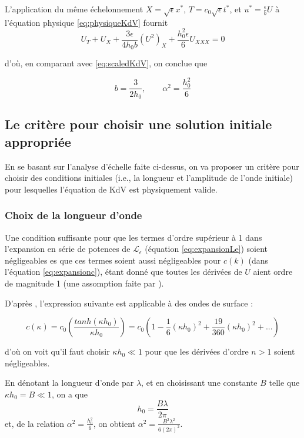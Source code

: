 \indent L'application du même échelonnement $ X=\sqrt{\epsilon}x^*$, $T =c_0 \sqrt{\epsilon} t^*$, et $u^* = \frac{\epsilon}{ b} U$ à l'équation physique \eqref{eq:physiqueKdV} fournit $$U_T + U_X + \frac{3\epsilon}{4h_0b} (U^2)_X + \frac{h_0^2\epsilon}{6}U_{XXX} = 0$$ 

\noindent d'où, en comparant avec  \eqref{eq:scaledKdV}, on conclue que 

\begin{equation}
\label{eq:analysisb}
b = \frac{3}{2h_0}, \qquad \alpha^2 = \frac{h_0^2}{6}
\end{equation} 


\subsection{Le critère pour choisir une solution initiale appropriée}

\indent En se basant sur l'analyse d'échelle faite ci-dessus, on va proposer un critère pour choisir des conditions initiales (i.e., la longueur et l'amplitude de l'onde initiale) pour lesquelles l'équation de KdV est physiquement valide. 

\subsubsection{Choix de la longueur d'onde}

\indent Une condition suffisante pour que les termes d'ordre supérieur à 1 dans l'expansion en série de potences de $\mathcal{L}_\epsilon$  (équation \ref{eq:expansionLe}) soient négligeables es que ces termes soient aussi négligeables pour $c(k)$ (dans l'équation \ref{eq:expansionc}), étant donné que toutes les dérivées de $U$ aient ordre de magnitude 1 (une assomption faite par \cite{BBM1971}).

\indent  D'après \cite{BBM1971}, l'expression suivante est applicable à des ondes de surface :

$$c(\kappa) = c_0 \left(\frac{tanh(\kappa h_0)}{\kappa h_0}\right) = c_0 \left(1 - \frac{1}{6}(\kappa h_0)^2 + \frac{19}{360}(\kappa h_0)^2 + ... \right) $$

\noindent d'où on voit qu'il faut choisir $\kappa h_0 \ll 1$ pour que les dérivées d'ordre $n>1$ soient négligeables.

\indent En dénotant la longueur d'onde par $\lambda$, et en choisissant une constante $B$ telle que $\kappa h_0  =  B \ll 1$, on a que $$h_0 = \frac{B\lambda}{2\pi}$$ et, de la relation $\alpha^2 = \frac{h_0^2}{6}$, on obtient $\alpha^2 = \frac{B^2\lambda^2}{6(2\pi)^2}$.


